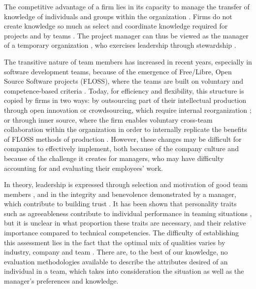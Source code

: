 The competitive advantage of a firm lies in its capacity to manage the transfer of knowledge of individuals and groups within the organization \citep{LocanderNapierScamell79,KogutZander92}. Firms do not create knowledge so much as select and coordinate knowledge \citep{Grant96,TiwanaMcLean05} required for projects \citep{Teeceal97} and by teams \citep{WuchtyJonesUzzi07}. The project manager can thus be viewed as the manager of a temporary organization \citep{TurnerMuller03}, who exercises leadership through stewardship \citep{DavisSchoormanDonaldson97}.

The transitive nature of team members has increased in recent years, especially in software development teams, because 
of the emergence of Free/Libre, Open Source Software projects (FLOSS), where the teams are built on voluntary and 
competence-based criteria \citep{Fitzgerald06}.
Today, for efficiency and flexibility, this structure is copied by firms in two ways:
by outsourcing part of their intellectual production through open innovation or crowdsourcing, which require
internal reorganization \citep{StolFitzgerald14}; or through inner source, where the firm enables voluntary cross-team 
collaboration within the organization in order to internally replicate the benefits of FLOSS methods of production
\citep{Stoletal11}. However, these changes may be difficult for companies to effectively implement, both because of
the company culture and because of the challenge it creates for managers, who may have difficulty accounting for
and evaluating their employees' work.

In theory, leadership is expressed through selection and motivation of good team members \citep{Guimeraetal05}, and in the integrity and benevolence demonstrated by a manager, which contribute to building trust \citep{KayworthLeidner02,JarvenpaaKnollLeidner98}. It has been shown that personality traits such as agreeableness contribute to individual performance in teaming situations \citep{mount:1998:five}, but it is unclear in what proportion these traits are necessary, and their relative importance compared to technical competencies. The difficulty of establishing this assessment lies in the fact that the optimal mix of qualities varies by industry, company and team \citep{bassellier:2001:information,wingreen:2017:professionals}. There are, to the best of our knowledge, no evaluation methodologies available to describe the attributes desired of an individual in a team, which takes into consideration the situation as well as the manager's preferences and knowledge.

